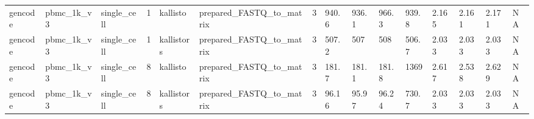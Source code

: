 \begin{tabular}{lllllllllllllll}
gencode & pbmc\_1k\_v3 & single\_cell & 1 & kallisto & prepared\_FASTQ\_to\_matrix & 3 & 940.6 & 936.1 & 966.3 & 939.8 & 2.165 & 2.161 & 2.171 & NA \\
gencode & pbmc\_1k\_v3 & single\_cell & 1 & kallistors & prepared\_FASTQ\_to\_matrix & 3 & 507.2 & 507 & 508 & 506.7 & 2.033 & 2.033 & 2.033 & NA \\
gencode & pbmc\_1k\_v3 & single\_cell & 8 & kallisto & prepared\_FASTQ\_to\_matrix & 3 & 181.7 & 181.1 & 181.8 & 1369 & 2.617 & 2.538 & 2.629 & NA \\
gencode & pbmc\_1k\_v3 & single\_cell & 8 & kallistors & prepared\_FASTQ\_to\_matrix & 3 & 96.16 & 95.97 & 96.24 & 730.7 & 2.033 & 2.033 & 2.033 & NA \\
\bottomrule
\end{tabular}
